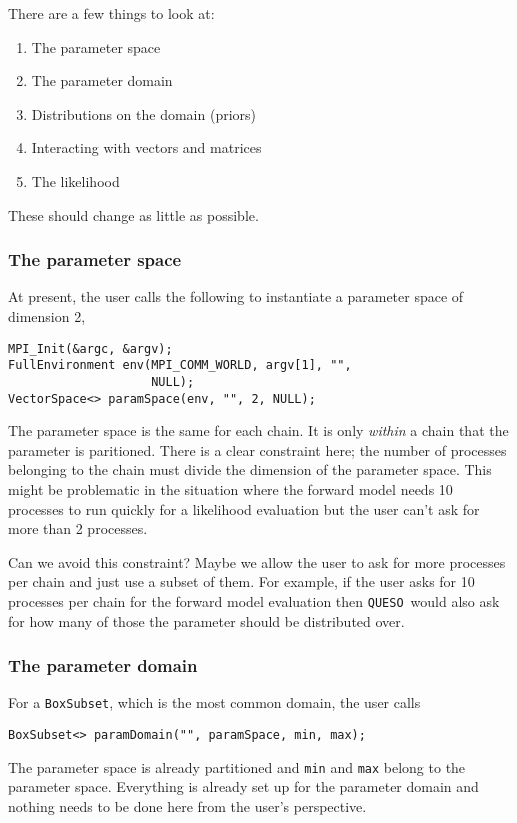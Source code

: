 \documentclass{article}
\newcommand{\Queso}{\texttt{QUESO}}
\begin{document}
There are a few things to look at:
\begin{enumerate}
  \item The parameter space
  \item The parameter domain
  \item Distributions on the domain (priors)
  \item Interacting with vectors and matrices
  \item The likelihood
\end{enumerate}
These should change as little as possible.

\subsubsection{The parameter space}

At present, the user calls the following to instantiate a parameter space of
dimension 2,
\begin{lstlisting}
MPI_Init(&argc, &argv);
FullEnvironment env(MPI_COMM_WORLD, argv[1], "",
                    NULL);
VectorSpace<> paramSpace(env, "", 2, NULL);
\end{lstlisting}
The parameter space is the same for each chain.  It is only \emph{within} a
chain that the parameter is paritioned.  There is a clear constraint here; the
number of processes belonging to the chain must divide the dimension of the
parameter space.  This might be problematic in the situation where the forward
model needs 10 processes to run quickly for a likelihood evaluation but the
user can't ask for more than 2 processes.

Can we avoid this constraint?  Maybe we allow the user to ask for more
processes per chain and just use a subset of them.  For example, if the user
asks for 10 processes per chain for the forward model evaluation then \Queso\
would also ask for how many of those the parameter should be distributed over.

\subsubsection{The parameter domain}

For a \lstinline|BoxSubset|, which is the most common domain, the user calls
\begin{lstlisting}
BoxSubset<> paramDomain("", paramSpace, min, max);
\end{lstlisting}
The parameter space is already partitioned and \lstinline|min| and
\lstinline|max| belong to the parameter space.  Everything is already set up
for the parameter domain and nothing needs to be done here from the user's
perspective.
\end{document}
